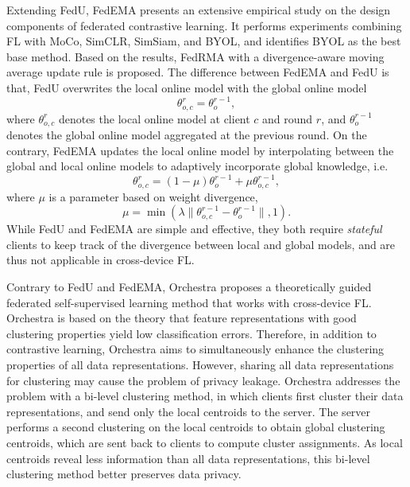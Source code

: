 \documentclass[11pt]{article}
\begin{document}
Extending FedU, FedEMA \cite{zhuang2022divergence} presents an extensive empirical study on the design components of federated contrastive learning. It performs experiments combining FL with MoCo, SimCLR, SimSiam, and BYOL, and identifies BYOL as the best base method. Based on the results, FedRMA with a divergence-aware moving average update rule is proposed. The difference between FedEMA and FedU is that, FedU overwrites the local online model with the global online model 
\begin{equation}
    \theta_{o, c}^{r} = \theta_{o}^{r-1},
\end{equation}
where $\theta_{o, c}^r$ denotes the local online model at client $c$ and round $r$, and $\theta_o^{r-1}$ denotes the global online model aggregated at the previous round. On the contrary, FedEMA updates the local online model by interpolating between the global and local online models to adaptively incorporate global knowledge, i.e. 
\begin{equation}
    \theta_{o, c}^r = (1-\mu)\theta_{o}^{r-1} + \mu \theta_{o,c}^{r-1}, 
\end{equation}
where $\mu$ is a parameter based on weight divergence, 
\begin{equation}
    \mu = \min (\lambda\|\theta_{o, c}^{r-1}-\theta_o^{r-1}\|, 1).
\end{equation}
While FedU and FedEMA are simple and effective, they both require \textit{stateful} clients to keep track of the divergence between local and global models, and are thus not applicable in cross-device FL. 

Contrary to FedU and FedEMA, Orchestra \cite{lubana2022orchestra} proposes a theoretically guided federated self-supervised learning method that works with cross-device FL. Orchestra is based on the theory that feature representations with good clustering properties yield low classification errors. Therefore, in addition to contrastive learning, Orchestra aims to simultaneously enhance the clustering properties of all data representations. However, sharing all data representations for clustering may cause the problem of privacy leakage. Orchestra addresses the problem with a bi-level clustering method, in which clients first cluster their data representations, and send only the local centroids to the server. The server performs a second clustering on the local centroids to obtain global clustering centroids, which are sent back to clients to compute cluster assignments. As local centroids reveal less information than all data representations, this bi-level clustering method better preserves data privacy. 
\end{document}
